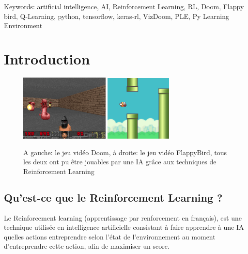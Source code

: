 \documentclass[a4paper,10pt,openany,oneside]{report}
\makeatletter
\renewcommand{\@makeschapterhead}[1]{%
  \vspace*{35\p@}%
  {\parindent \z@ \raggedright
    \normalfont
    \interlinepenalty\@M
    \Huge \bfseries  #1\par\nobreak
    \vskip 20\p@
  }}
\makeatother
\begin{document}
Keywords: artificial intelligence, AI, Reinforcement Learning, RL, Doom, Flappy bird, Q-Learning, python, tensorflow, keras-rl, VizDoom, PLE, Py Learning Environment
\pagebreak

\tableofcontents

\setcounter{page}{0}
\pagestyle{headings}
\renewcommand{\@makeschapterhead}[1]{%
  \vspace*{50\p@}%
  {\parindent \z@ \raggedright
    \normalfont
    \interlinepenalty\@M
    \Huge \bfseries  #1\par\nobreak
    \vskip 40\p@
  }} 
\chapter{Introduction}
\thispagestyle{headings}
\begin{figure}[H]
	\centering
	\includegraphics[width=0.4\textwidth]{img/doom.png}
	\includegraphics[width=0.3\textwidth]{img/flappybird.png}
	\caption{A gauche: le jeu vidéo Doom, à droite: le jeu vidéo FlappyBird, tous les deux ont pu être jouables par une IA grâce aux techniques de Reinforcement Learning}
\end{figure}
\section{Qu'est-ce que le Reinforcement Learning ?}
Le Reinforcement learning (apprentissage par renforcement en français), est une technique utilisée en intelligence artificielle consistant à faire apprendre à une IA  quelles actions  entreprendre selon l'état de l'environnement au moment d'entreprendre cette action, afin de maximiser un score.\cite[]{wikipediaRL}
\end{document}
